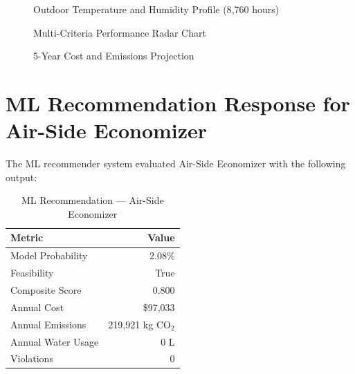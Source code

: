 \documentclass[12pt,a4paper]{report}
\begin{document}
\begin{figure}[H]
\centering
{}
\caption{Outdoor Temperature and Humidity Profile (8{,}760 hours)}
\label{fig:air_ambient}
\end{figure}

\begin{figure}[H]
\centering
{}
\caption{Multi-Criteria Performance Radar Chart}
\label{fig:air_radar}
\end{figure}

\begin{figure}[H]
\centering
{}
\caption{5-Year Cost and Emissions Projection}
\label{fig:air_5yr}
\end{figure}

\section{ML Recommendation Response for Air-Side Economizer}

The ML recommender system evaluated Air-Side Economizer with the following output:

\begin{table}[H]
\centering
\caption{ML Recommendation --- Air-Side Economizer}
\label{tab:air_ml}
\renewcommand{\arraystretch}{1.3}
\begin{tabular}{lr}
\toprule
\textbf{Metric} & \textbf{Value} \\
\midrule
Model Probability & 2.08\% \\
Feasibility & True \\
Composite Score & 0.800 \\
Annual Cost & \$97{,}033 \\
Annual Emissions & 219{,}921 kg CO$_2$ \\
Annual Water Usage & 0 L \\
Violations & 0 \\
\bottomrule
\end{tabular}
\end{table}
\end{document}
